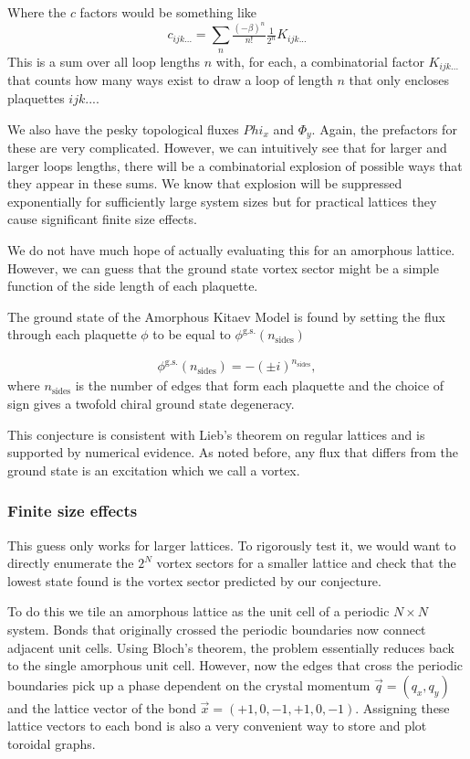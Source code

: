 Where the \(c\) factors would be something like \[c_{ijk...} = \sum_n \tfrac{(-\beta)^n}{n!} \tfrac{1}{2^n} K_{ijk...}\] This is a sum over all loop lengths \(n\) with, for each, a combinatorial factor \(K_{ijk...}\) that counts how many ways exist to draw a loop of length \(n\) that only encloses plaquettes \(ijk...\).

We also have the pesky topological fluxes \(Phi_x\) and \(\Phi_y\). Again, the prefactors for these are very complicated. However, we can intuitively see that for larger and larger loops lengths, there will be a combinatorial explosion of possible ways that they appear in these sums. We know that explosion will be suppressed exponentially for sufficiently large system sizes but for practical lattices they cause significant finite size effects.

We do not have much hope of actually evaluating this for an amorphous lattice. However, we can guess that the ground state vortex sector might be a simple function of the side length of each plaquette.

The ground state of the Amorphous Kitaev Model is found by setting the flux through each plaquette \(\phi\) to be equal to \(\phi^{\mathrm{g.s.}}(n_{\mathrm{sides}})\)

\[\begin{aligned}
    \phi^{\mathrm{g.s.}}(n_{\mathrm{sides}}) = -(\pm i)^{n_{\mathrm{sides}}},
\end{aligned}\] where \(n_{\mathrm{sides}}\) is the number of edges that form each plaquette and the choice of sign gives a twofold chiral ground state degeneracy.

This conjecture is consistent with Lieb's theorem on regular lattices \autocite{lieb_flux_1994} and is supported by numerical evidence. As noted before, any flux that differs from the ground state is an excitation which we call a vortex.

\hypertarget{finite-size-effects}{%
\subsubsection{Finite size effects}\label{finite-size-effects}}

This guess only works for larger lattices. To rigorously test it, we would want to directly enumerate the \(2^N\) vortex sectors for a smaller lattice and check that the lowest state found is the vortex sector predicted by our conjecture.

To do this we tile an amorphous lattice as the unit cell of a periodic \(N\times N\) system. Bonds that originally crossed the periodic boundaries now connect adjacent unit cells. Using Bloch's theorem, the problem essentially reduces back to the single amorphous unit cell. However, now the edges that cross the periodic boundaries pick up a phase dependent on the crystal momentum \(\vec{q} = (q_x, q_y)\) and the lattice vector of the bond \(\vec{x} = (+1, 0, -1, +1, 0, -1)\). Assigning these lattice vectors to each bond is also a very convenient way to store and plot toroidal graphs.

